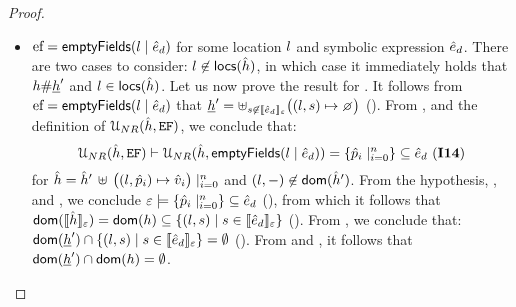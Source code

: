 \begin{proof}
\begin{itemize}
  \item $\mathtt{\text{ef}} = \mathsf{emptyFields}(l \mid \hat{e}_d)$ for some location $l$ and symbolic expression $\hat{e}_d$. 
           There are two cases to consider:  $l \not\in {\sf locs}(\hat{h})$, in which case 
	    it immediately holds that $h \# \underline{h}'$ and  $l \in {\sf locs}(\hat{h})$. 
	    Let us now prove the result for . 
	    It follows from $\mathtt{\text{ef}} = \mathsf{emptyFields}(l \mid \hat{e}_d)$ that $\iheap' = \uplus_{\jstring \not\in \symbeval{\sexpr_d}{\senv}}\big((\loc, \jstring) \mapsto \none\big)$ (). 
            From , and the definition of ${\cal U}_{NR}(\hat{h}, \mathtt{EF})$, 
	    we conclude that: 
	    $$
	       {\cal U}_{NR}(\hat{h}, \mathtt{EF}) \vdash {\cal U}_{NR}(\hat{h}, \mathsf{emptyFields}(l \mid \hat{e}_d)) =  \{ \hat{p}_i \mid_{i = 0}^n \} \subseteq \hat{e}_d \text{ ({\bf I14})} 
	    $$
	    for $\hat{h} = \hat{h}' \, \uplus \,  \big((l, \hat{p}_i) \mapsto \hat{v}_i\big)\mid_{i = 0}^n$ and $(l, -) \not\in \mathsf{dom}(\hat{h}')$. 
	    From the hypothesis, , and , we conclude $\varepsilon \models \{ \hat{p}_i \mid_{i = 0}^n \} \subseteq \hat{e}_d$ (), 
	    from which it follows that $\mathsf{dom}(\llbracket \hat{h} \rrbracket_{\varepsilon}) = \mathsf{dom}(h) \subseteq \{ (l, s) \mid s \in \llbracket \hat{e}_d \rrbracket_{\varepsilon} \}$ (). 
	    From , we conclude that: $\mathsf{dom}(\underline{h}') \cap \{ (l, s) \mid s \in  \llbracket \hat{e}_d \rrbracket_{\varepsilon} \} = \emptyset$ ().
	    From  and , it follows that $\mathsf{dom}(\underline{h}') \cap \mathsf{dom}(h) = \emptyset$. 
\end{itemize}
\end{proof}



